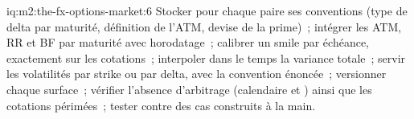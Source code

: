 \begin{solution}{iq:m2:the-fx-options-market:6}
Stocker pour chaque paire ses conventions (type de delta par maturité, définition de l'ATM, devise de la
prime)~; intégrer les ATM, RR et BF par maturité avec horodatage~; calibrer un smile par
échéance, exactement sur les cotations~; interpoler dans le temps la variance totale~; servir
les volatilités par strike ou par delta, avec la convention énoncée~; versionner chaque surface~;
vérifier l'absence d'arbitrage (calendaire et ) ainsi que les cotations périmées~; tester contre
des cas construits à la main.
\end{solution}
